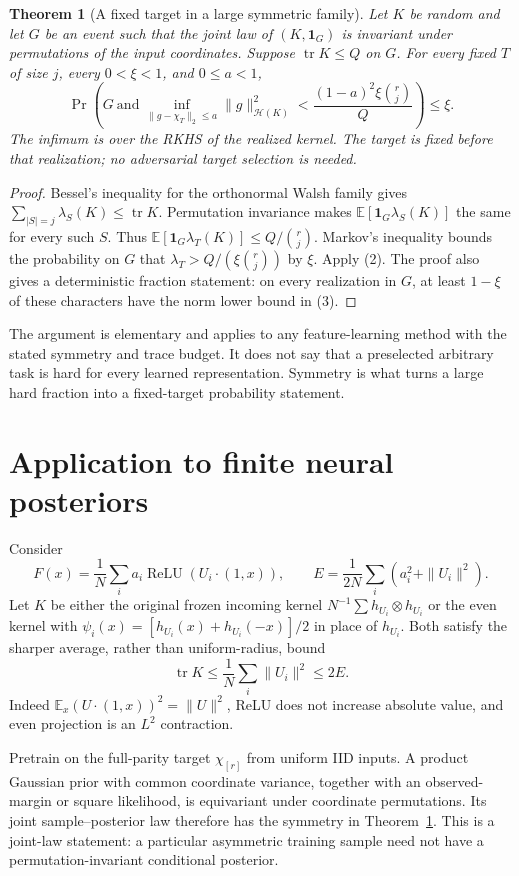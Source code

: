 \documentclass[11pt]{article}
\newtheorem{theorem}{Theorem}\newtheorem{lemma}[theorem]{Lemma}
\newcommand{\E}{\mathbb E}\newcommand{\R}{\mathbb R}
\newcommand{\relu}{\operatorname{ReLU}}
\begin{document}
\begin{theorem}[A fixed target in a large symmetric family]\label{thm:trace}
Let $K$ be random and let $G$ be an event such that the joint law
of $(K,\mathbf1_G)$ is invariant under permutations of the input
coordinates. Suppose $\operatorname{tr}K\le Q$ on $G$.
For every fixed $T$ of size $j$, every $0<\xi<1$, and $0\le a<1$,
\[
 \Pr\left(G\ \text{and}\
 \inf_{\|g-\chi_T\|_2\le a}\|g\|_{\mathcal H(K)}^2
              <\frac{(1-a)^2\xi\binom rj}{Q}\right)\le\xi.
 \tag{3}
\]
The infimum is over the RKHS of the realized kernel. The target is
fixed before that realization; no adversarial target selection is needed.
\end{theorem}
\begin{proof}
Bessel's inequality for the orthonormal Walsh family gives
$\sum_{|S|=j}\lambda_S(K)\le\operatorname{tr}K$.
Permutation invariance makes
$\E[\mathbf1_G\lambda_S(K)]$ the same for every such $S$.
Thus $\E[\mathbf1_G\lambda_T(K)]\le Q/\binom rj$.
Markov's inequality bounds the probability on $G$ that
$\lambda_T>Q/(\xi\binom rj)$ by $\xi$. Apply (2).
The proof also gives a deterministic fraction statement: on every
realization in $G$, at least $1-\xi$ of these characters have the
norm lower bound in (3).
\end{proof}

The argument is elementary and applies to any feature-learning method
with the stated symmetry and trace budget. It does not say that a
preselected arbitrary task is hard for every learned representation.
Symmetry is what turns a large hard fraction into a fixed-target
probability statement.

\section{Application to finite neural posteriors}
Consider
\[
 F(x)=\frac1N\sum_i a_i\relu(U_i\cdot(1,x)),\qquad
 E=\frac1{2N}\sum_i(a_i^2+\|U_i\|^2).
\]
Let $K$ be either the original frozen incoming kernel
$N^{-1}\sum h_{U_i}\otimes h_{U_i}$ or the even kernel with
$\psi_i(x)=[h_{U_i}(x)+h_{U_i}(-x)]/2$ in place of $h_{U_i}$.
Both satisfy the sharper average, rather than uniform-radius, bound
\[
 \operatorname{tr}K\le\frac1N\sum_i\|U_i\|^2\le2E.   \tag{4}
\]
Indeed $\E_x(U\cdot(1,x))^2=\|U\|^2$, ReLU does not increase
absolute value, and even projection is an $L^2$ contraction.

Pretrain on the full-parity target $\chi_{[r]}$ from uniform IID
inputs. A product Gaussian prior with common coordinate variance,
together with an observed-margin or square likelihood, is equivariant
under coordinate permutations. Its joint sample--posterior law therefore
has the symmetry in Theorem~\ref{thm:trace}.
This is a joint-law statement: a particular asymmetric training sample
need not have a permutation-invariant conditional posterior.
\end{document}
